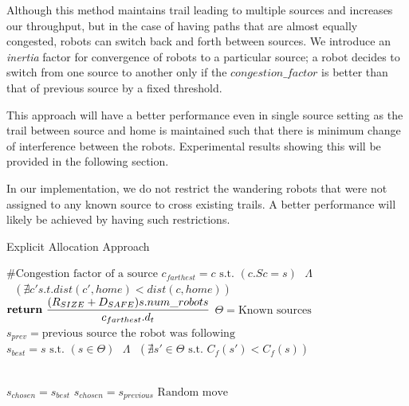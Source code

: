 \documentclass[letterpaper, 10 pt, conference]{ieeeconf}  %
\begin{document}
Although this method maintains trail leading to multiple sources and increases our throughput, but in the case of having paths that are almost equally congested, robots can switch back and forth between sources. We introduce an \emph{inertia} factor for convergence of robots to a particular source; a robot decides to switch from one source to another only if the $congestion\_factor$ is better than that of previous source by a fixed threshold.

This approach will have a better performance even in single source setting as the trail between source and home is maintained such that there is minimum change of interference between the robots. Experimental results showing this will be provided in the following section. 

In our implementation, we do not restrict the wandering robots that were not assigned to any known source to cross existing trails. A better performance will likely be achieved by having such restrictions.

\begin{algorithm}
\caption{Explicit Allocation Approach}\label{algorithm:2}
\begin{algorithmic}
\State $\text{\# Congestion factor of a source}$
  \State $c_{farthest} =  c \text{ s.t. } (c.Sc=s) \text{ } \Lambda$
  \State  $\text{                                                 }(\nexists c' { s.t. } dist(c', home) < dist(c, home))$
  \\
  \State $\bold{return} \text{ } \dfrac{(R_{SIZE} + D_{SAFE})  s.num\_robots}{ c_{farthest}.d_t }$
\EndProcedure
\State $\Theta = \text{Known sources}$
\State $s_{prev} = \text{previous source the robot was following}$
\State $s_{best} = s \text{ s.t. } (s \in \Theta) \text{ } \Lambda \text{ } (\nexists s' \in \Theta \text{ s.t. } C_f(s') < C_f(s))$

\\
     \State $s_{chosen} = s_{best}$
  \Else
     \State $s_{chosen} = s_{previous}$
  \EndIf
\Else
   \State $\text{Random move}$
\EndIf

\end{algorithmic}
\end{algorithm}
\end{document}
